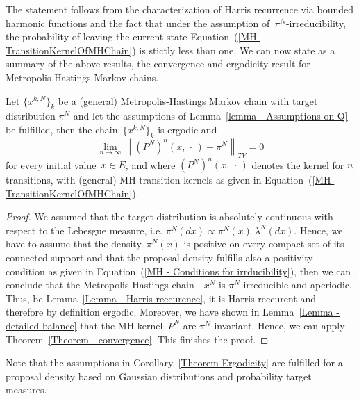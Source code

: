 The statement follows from the characterization of Harris recurrence via bounded harmonic functions and the fact that under the assumption of~$\pi^{N}$-irreducibility, the probability of leaving the current state Equation~(\ref{MH-TransitionKernelOfMHChain}) is stictly less than one. We can now state as a summary of the above results, the convergence and ergodicity result for Metropolis-Hastings Markov chains.

\begin{cor}
\label{Theorem-Ergodicity}
 Let  $ \{ x^{k,N} \}_{k} $ be a (general) Metropolis-Hastings Markov chain with target distribution $ \pi^{N} $ and let the assumptions of Lemma~\ref{lemma - Assumptions on Q} be fulfilled,
 then the chain~$ \{ x^{k,N} \}_{k} $ is ergodic and
  \begin{equation}
  \label{Theorem-Ergodicity-Statement2}
   \lim_{n \to \infty} \left\|  \left( P^{N} \right)^n (x, \, \cdot \, ) -  \pi^{N}   \right\|_{TV} = 0
  \end{equation}
  for every initial value~$x \in E$, and where $ \left( P^{N} \right)^n (x, \, \cdot \, ) $ denotes the kernel for $n$ transitions, with (general) MH transition kernels as given in Equation~(\ref{MH-TransitionKernelOfMHChain}).

\end{cor}


\begin{proof}
 We assumed that the target distribution is absolutely continuous with respect to the Lebesgue measure, i.e. $ \pi^{N}(dx) \varpropto \pi^{N}(x) \; \lambda^{N}(dx) $. Hence, we have to assume that the density~$\pi^N(x)$ is positive on every compact set of its connected support and that the proposal density fulfills also a positivity condition as given in Equation~(\ref{MH - Conditions for irrducibility}), then we can conclude that the Metropolis-Hastings chain~~$x^{N}$ is $\pi^{N}$-irreducible and aperiodic. Thus, be Lemma~\ref{Lemma - Harris reccurence}, it is Harris reccurent and therefore by definition ergodic. Moreover, we have shown in Lemma~\ref{Lemma - detailed balance} that the MH kernel~$P^N$ are $\pi^{N}$-invariant. Hence, we can apply Theorem~\ref{Theorem - convergence}. This finishes the proof.
\end{proof}

Note that the assumptions in Corollary~\ref{Theorem-Ergodicity} are fulfilled for a proposal density based on Gaussian distributions and probability target measures.





